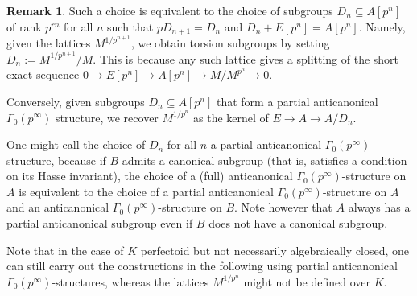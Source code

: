 \documentclass[10pt,oneside]{amsart}
\theoremstyle{definition}
\newtheorem{remark}[theorem]{Remark}
\begin{document}
	\begin{remark}
		Such a choice is equivalent to the choice of subgroups $D_n\subseteq A[p^n]$ of rank $p^{rn}$ for all $n$ such that $pD_{n+1}=D_n$ and $D_n+E[p^n]=A[p^n]$. Namely,
		given the lattices $M^{1/p^{n+1}}$, we obtain torsion subgroups by setting $D_n:=M^{1/p^{n+1}}/M$. This is because any such lattice gives a splitting of the short exact sequence $0\rightarrow E[p^n]\rightarrow A[p^n]\rightarrow M/M^{p^n} \rightarrow 0$.
		
		Conversely, given subgroups $D_n\subseteq A[p^n]$ that form a partial anticanonical $\Gamma_0(p^\infty)$ structure, we recover $M^{1/p^n}$ as the kernel of $E\rightarrow A\rightarrow A/D_n$.
		
		One might call the choice of $D_n$ for all $n$ a partial anticanonical $\Gamma_0(p^\infty)$-structure, because if $B$ admits a canonical subgroup (that is, satisfies a condition on its Hasse invariant), the choice of a (full) anticanonical $\Gamma_0(p^\infty)$-structure on $A$ is equivalent to the choice of a partial anticanonical $\Gamma_0(p^\infty)$-structure on $A$ and an anticanonical $\Gamma_0(p^\infty)$-structure on $B$. Note however that $A$ always has a partial anticanonical subgroup even if $B$ does not have a canonical subgroup.
		
		Note that in the case of $K$ perfectoid but not necessarily algebraically closed, one can still carry out the constructions in the following using partial anticanonical $\Gamma_0(p^\infty)$-structures, whereas the lattices $M^{1/p^n}$ might not be defined over $K$.
	\end{remark}
	
\end{document}
